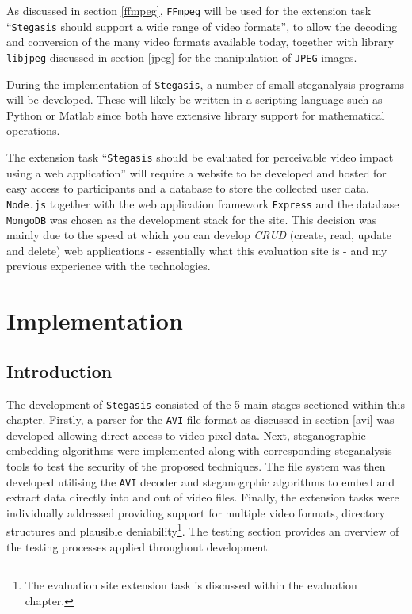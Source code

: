 \documentclass[paper=a4, fontsize=11pt,twoside]{scrartcl}    %
\numberwithin{table}{section}
\numberwithin{figure}{section}
\numberwithin{algorithm}{section}
\begin{document}
As discussed in section \ref{ffmpeg}, \texttt{FFmpeg} will be used for the extension task ``\texttt{Stegasis} should support a wide range of video formats'', to allow the decoding and conversion of the many video formats available today, together with library \texttt{libjpeg} discussed in section \ref{jpeg} for the manipulation of \texttt{JPEG} images. 

During the implementation of \texttt{Stegasis}, a number of small steganalysis programs will be developed. These will likely be written in a scripting language such as Python or Matlab since both have extensive library support for mathematical operations.

The extension task ``\texttt{Stegasis} should be evaluated for perceivable video impact using a web application'' will require a website to be developed and hosted for easy access to participants and a database to store the collected user data. \texttt{Node.js} together with the web application framework \texttt{Express} and the database \texttt{MongoDB} was chosen as the development stack for the site. This decision was mainly due to the speed at which you can develop \textit{CRUD} (create, read, update and delete) web applications - essentially what this evaluation site is - and my previous experience with the technologies.


\section{Implementation}

\subsection{Introduction}

The development of \texttt{Stegasis} consisted of the 5 main stages sectioned within this chapter. Firstly, a parser for the \texttt{AVI} file format as discussed in section \ref{avi} was developed allowing direct access to video pixel data. Next, steganographic embedding algorithms were implemented along with corresponding steganalysis tools to test the security of the proposed techniques. The file system was then developed utilising the \texttt{AVI} decoder and steganogrphic algorithms to embed and extract data directly into and out of video files. Finally, the extension tasks were individually addressed providing support for multiple video formats, directory structures and plausible deniability\footnote{The evaluation site extension task is discussed within the evaluation chapter.}. The testing section provides an overview of the testing processes applied throughout development. 
\end{document}

